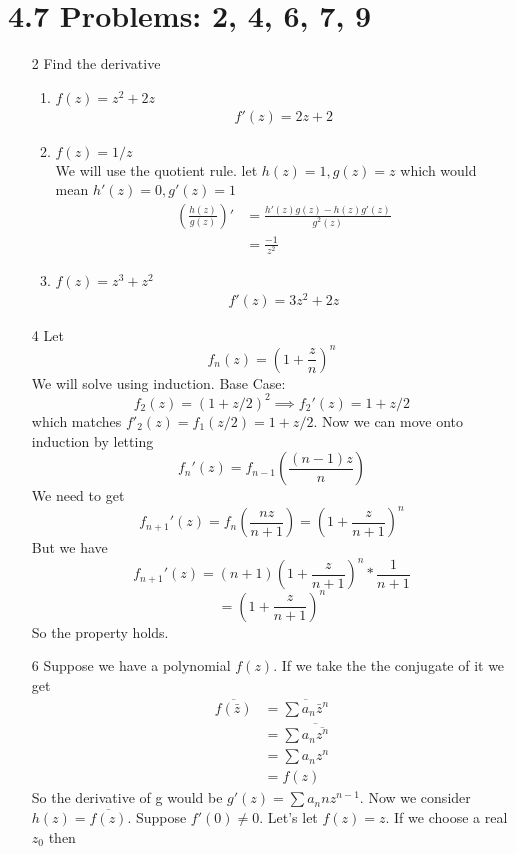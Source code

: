 \documentclass{article}
\begin{document}
  \section{4.7 Problems: 2, 4, 6, 7, 9}
  \begin{enumerate}
    \item[2] Find the derivative
      \begin{enumerate}[label=(\roman*)]
        \item $f(z)=z^2+2z$\\
          \begin{align*}
            f'(z)=2z+2
          \end{align*}
        \item $f(z)=1/z$\\
          We will use the quotient rule. let $h(z)=1,g(z)=z$ which would mean $h'(z)=0,g'(z)=1$
          \begin{align*}
            \left(\frac{h(z)}{g(z)}\right)'&=\frac{h'(z)g(z)-h(z)g'(z)}{g^2(z)}\\
            &=\frac{-1}{z^2}
          \end{align*}
        \item $f(z)=z^3+z^2$
          \begin{align*}
            f'(z)=3z^2+2z
          \end{align*}
      \end{enumerate}
    \item[4]
      Let
      \[f_n(z)=\left(1+\frac{z}{n}\right)^n\]
      We will solve using induction. Base Case:
      \[f_2(z)=(1+z/2)^2\implies f_2'(z)=1+z/2\]
      which matches $f'_2(z)=f_1(z/2)=1+z/2$. Now we can move onto induction by letting
      \[f_n'(z)=f_{n-1}\left(\frac{(n-1)z}{n}\right)\]
      We need to get
      \[f_{n+1}'(z)=f_n\left(\frac{nz}{n+1}\right)=\left(1+\frac{z}{n+1}\right)^n\]
      But we have
      \[f_{n+1}'(z)=(n+1)\left(1+\frac{z}{n+1}\right)^n*\frac{1}{n+1}\]
      \[=\left(1+\frac{z}{n+1}\right)^n\]
      So the property holds.
    \item[6] %
      Suppose we have a polynomial $f(z)$. If we take the the conjugate of it we get
      \begin{align*}
        \overline{f(\bar{z})}&=\overline{\sum a_n\bar{z}^n}\\
        &=\sum \overline{a_n\overline{z^n}}\\
        &=\sum a_nz^n\\
        &=f(z)
      \end{align*}
      So the derivative of g would be $g'(z)=\sum a_nnz^{n-1}$. Now we consider $h(z)=\overline{f(z)}$. Suppose $f'(0)\neq0$. Let's let $f(z)=z$. If we choose a real $z_0$ then

\end{enumerate}
\end{document}
